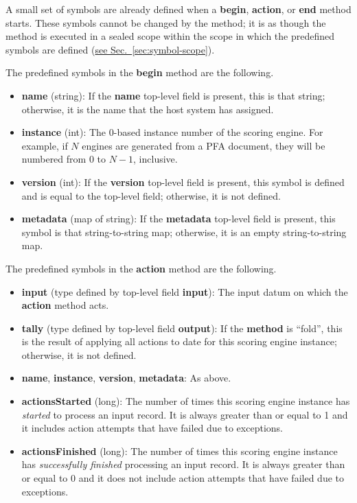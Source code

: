 \documentclass{article}
\newcommand{\PFAc}{\ttfamily\bfseries}
\theoremstyle{definition}
\begin{document}
A small set of symbols are already defined when a {\PFAc begin}, {\PFAc action}, or {\PFAc end} method starts.  These symbols cannot be changed by the method; it is as though the method is executed in a sealed scope within the scope in which the predefined symbols are defined (\hyperlink{hsec:symbol-scope}{see Sec.~\ref{sec:symbol-scope}}).

\noindent The predefined symbols in the {\PFAc begin} method are the following.
\begin{itemize}
\item {\PFAc name} (string): If the {\PFAc name} top-level field is present, this is that string; otherwise, it is the name that the host system has assigned.
\item {\PFAc instance} (int): The 0-based instance number of the scoring engine.  For example, if $N$ engines are generated from a PFA document, they will be numbered from $0$ to $N-1$, inclusive.
\item {\PFAc version} (int): If the {\PFAc version} top-level field is present, this symbol is defined and is equal to the top-level field; otherwise, it is not defined.
\item {\PFAc metadata} (map of string): If the {\PFAc metadata} top-level field is present, this symbol is that string-to-string map; otherwise, it is an empty string-to-string map.
\end{itemize}

\noindent The predefined symbols in the {\PFAc action} method are the following.
\begin{itemize}
\item {\PFAc input} (type defined by top-level field {\PFAc input}): The input datum on which the {\PFAc action} method acts.
\item {\PFAc tally} (type defined by top-level field {\PFAc output}): If the {\PFAc method} is ``fold'', this is the result of applying all actions to date for this scoring engine instance; otherwise, it is not defined.
\item {\PFAc name}, {\PFAc instance}, {\PFAc version}, {\PFAc metadata}: As above.
\item {\PFAc actionsStarted} (long): The number of times this scoring engine instance has {\it started} to process an input record.  It is always greater than or equal to 1 and it includes action attempts that have failed due to exceptions.
\item {\PFAc actionsFinished} (long): The number of times this scoring engine instance has {\it successfully finished} processing an input record.  It is always greater than or equal to 0 and it does not include action attempts that have failed due to exceptions.
\end{itemize}
\end{document}
